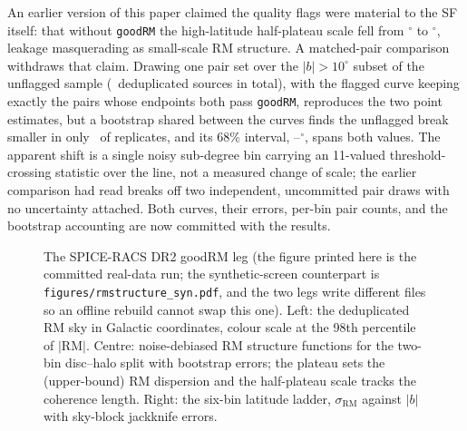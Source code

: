 \documentclass[twocolumn]{aastex631}
\newcommand{\code}[1]{\texttt{#1}}
\begin{document}
An earlier version of this paper claimed the quality flags were material to the SF itself:
that without \code{goodRM} the high-latitude half-plateau scale fell from
\rmsRealBreakHiFlagM$^\circ$ to \rmsRealBreakHiUnflagged$^\circ$, leakage masquerading as
small-scale RM structure. A matched-pair comparison withdraws that claim. Drawing one pair set
over the $|b|>10^\circ$ subset of the unflagged sample (\rmsRealNUnflagged\ deduplicated
sources in total), with the flagged curve keeping exactly the pairs whose endpoints both pass
\code{goodRM}, reproduces the two point estimates, but a bootstrap shared between the
curves finds the unflagged break smaller in only \rmsRealBreakFracSmall\ of replicates, and
its 68\% interval, \rmsRealBreakHiUnflagLo--\rmsRealBreakHiUnflagHi$^\circ$, spans both
values. The apparent shift is a single noisy sub-degree bin carrying an 11-valued
threshold-crossing statistic over the line, not a measured change of scale; the earlier
comparison had read breaks off two independent, uncommitted pair draws with no uncertainty
attached. Both curves, their errors, per-bin pair counts, and the bootstrap accounting are now
committed with the results.

\begin{figure}
\caption{The SPICE-RACS DR2 goodRM leg (the figure printed here is the committed real-data
run; the synthetic-screen counterpart is \code{figures/rmstructure\_syn.pdf}, and the two legs
write different files so an offline rebuild cannot swap this one). Left: the deduplicated RM
sky in Galactic coordinates, colour scale at the 98th percentile of $|$RM$|$. Centre:
noise-debiased RM structure functions for the two-bin disc--halo split with bootstrap errors;
the plateau sets the (upper-bound) RM dispersion and the half-plateau scale tracks the
coherence length. Right: the six-bin latitude ladder, $\sigma_\mathrm{RM}$ against $|b|$ with
sky-block jackknife errors.}
\label{fig:rms}
\end{figure}
\end{document}
